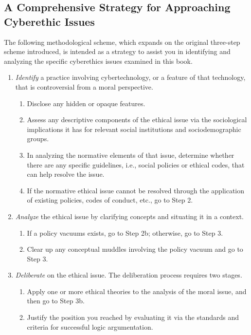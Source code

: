 \documentclass[12pt]{article}
\theoremstyle{definition}
\begin{document}
\subsection{A Comprehensive Strategy for Approaching Cyberethic Issues}
The following methodological scheme, which expands on the original three-step scheme
introduced, is intended as a strategy to assist you in identifying and
analyzing the specific cyberethics issues examined in this book.
\begin{enumerate}[label=Step \arabic*]
\item \textit{Identify} a practice involving cybertechnology, or a feature of that technology, that is controversial from a moral perspective.
\begin{enumerate}[label=1\alph*]
\item Disclose any hidden or opaque features.
\item Assess any descriptive components of the ethical issue via the sociological
implications it has for relevant social institutions and sociodemographic
groups.
\item  In analyzing the normative elements of that issue, determine whether there
are any specific guidelines, i.e., social policies or ethical codes, that can help
resolve the issue.
\item If the normative ethical issue cannot be resolved through the application of
existing policies, codes of conduct, etc., go to Step 2.
\end{enumerate}
\item \textit{Analyze} the ethical issue by clarifying concepts and situating it in a context.
\begin{enumerate}[label=2\alph*]
\item If a policy vacuums exists, go to Step 2b; otherwise, go to Step 3.
\item Clear up any conceptual muddles involving the policy vacuum and go to
Step 3.
\end{enumerate}
\item \textit{Deliberate} on the ethical issue. The deliberation process requires two stages.
\begin{enumerate}[label=3\alph*]
\item Apply one or more ethical theories to the analysis of the
moral issue, and then go to Step 3b.
\item Justify the position you reached by evaluating it via the standards and
criteria for successful logic argumentation.
\end{enumerate}
\end{enumerate}
\clearpage
\end{document}
